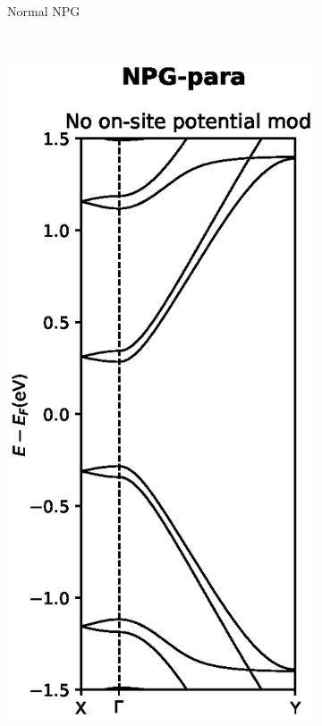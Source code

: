 \begin{figure}
\begin{subfigure}[b]{0.3\textwidth}
		\caption{Normal NPG}
		\label{Fabbs}
	\end{subfigure}
	~ %
	\begin{subfigure}[b]{0.3\textwidth}
		\includegraphics[width=\textwidth]{Figures/paraNPGBS.eps}

\end{subfigure}
\end{figure}
